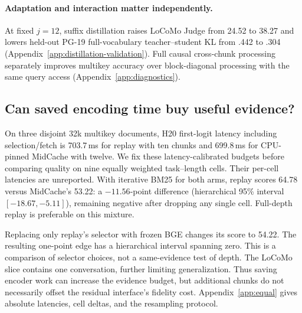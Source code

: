 \paragraph{Adaptation and interaction matter independently.}
At fixed $j=12$, suffix distillation raises LoCoMo Judge from 24.52 to 38.27 and lowers held-out PG-19 full-vocabulary teacher--student KL from .442 to .304 (Appendix~\ref{app:distillation-validation}). Full causal cross-chunk processing separately improves multikey accuracy over block-diagonal processing with the same query access (Appendix~\ref{app:diagnostics}).

\subsection{Can saved encoding time buy useful evidence?}
\label{sec:equallatency}
On three disjoint 32k multikey documents, H20 first-logit latency including selection/fetch is 703.7\,ms for replay with ten chunks and 699.8\,ms for CPU-pinned MidCache with twelve. We fix these latency-calibrated budgets before comparing quality on nine equally weighted task--length cells. Their per-cell latencies are unreported. With iterative BM25 for both arms, replay scores 64.78 versus MidCache's 53.22: a $-11.56$-point difference (hierarchical 95\% interval $[-18.67,-5.11]$), remaining negative after dropping any single cell. Full-depth replay is preferable on this mixture.

Replacing only replay's selector with frozen BGE changes its score to 54.22. The resulting one-point edge has a hierarchical interval spanning zero. This is a comparison of selector choices, not a same-evidence test of depth. The LoCoMo slice contains one conversation, further limiting generalization. Thus saving encoder work can increase the evidence budget, but additional chunks do not necessarily offset the residual interface's fidelity cost. Appendix~\ref{app:equal} gives absolute latencies, cell deltas, and the resampling protocol.
